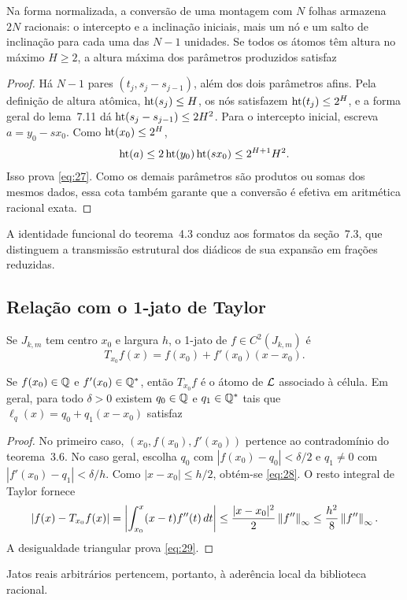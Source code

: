 \begin{proposicao}
Na forma normalizada, a conversão de uma montagem com $N$ folhas armazena $2N$ racionais: o intercepto e a inclinação iniciais, mais um nó e um salto de inclinação para cada uma das $N-1$ unidades. Se todos os átomos têm altura no máximo $H\ge2$, a altura máxima dos parâmetros produzidos satisfaz
\end{proposicao}
\begin{proof}
Há $N-1$ pares $(t_j,s_j-s_{j-1})$, além dos dois parâmetros afins. Pela definição de altura atômica, $\operatorname{ht}(s_j)\le H$, os nós satisfazem $\operatorname{ht}(t_j)\le2^H$, e a forma geral do lema~7.11 dá $\operatorname{ht}(s_j-s_{j-1})\le2H^2$. Para o intercepto inicial, escreva $a=y_0-sx_0$. Como $\operatorname{ht}(x_0)\le2^H$,
\[
\operatorname{ht}(a)\le2\operatorname{ht}(y_0)\operatorname{ht}(sx_0)\le2^{H+1}H^2.
\]
Isso prova \eqref{eq:27}. Como os demais parâmetros são produtos ou somas dos mesmos dados, essa cota também garante que a conversão é efetiva em aritmética racional exata.
\end{proof}
A identidade funcional do teorema~4.3 conduz aos formatos da seção~7.3, que distinguem a transmissão estrutural dos diádicos de sua expansão em frações reduzidas.

\subsection{Relação com o 1-jato de Taylor}
Se $J_{k,m}$ tem centro $x_0$ e largura $h$, o 1-jato de $f\in C^2(J_{k,m})$ é
\[
T_{x_0}f(x)=f(x_0)+f'(x_0)(x-x_0).
\]
\begin{proposicao}
Se $f(x_0)\in\mathbb Q$ e $f'(x_0)\in\mathbb Q^*$, então $T_{x_0}f$ é o átomo de $\mathcal L$ associado à célula. Em geral, para todo $\delta>0$ existem $q_0\in\mathbb Q$ e $q_1\in\mathbb Q^*$ tais que $\ell_q(x)=q_0+q_1(x-x_0)$ satisfaz
\end{proposicao}
\begin{proof}
No primeiro caso, $(x_0,f(x_0),f'(x_0))$ pertence ao contradomínio do teorema~3.6. No caso geral, escolha $q_0$ com $|f(x_0)-q_0|<\delta/2$ e $q_1\ne0$ com $|f'(x_0)-q_1|<\delta/h$. Como $|x-x_0|\le h/2$, obtém-se \eqref{eq:28}. O resto integral de Taylor fornece
\[
|f(x)-T_{x_0}f(x)|=\left|\int_{x_0}^x(x-t)f''(t)\,dt\right|
\le\frac{|x-x_0|^2}2\left\|f''\right\|_{\infty}\le\frac{h^2}8\left\|f''\right\|_{\infty}.
\]
A desigualdade triangular prova \eqref{eq:29}.
\end{proof}
Jatos reais arbitrários pertencem, portanto, à aderência local da biblioteca racional.
